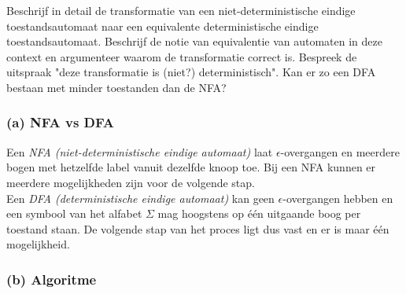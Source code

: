 \begin{question}
Beschrijf in detail de transformatie van een niet-deterministische eindige toestandsautomaat naar een equivalente deterministische eindige toestandsautomaat. Beschrijf de notie van equivalentie van automaten in deze context en argumenteer waarom de transformatie correct is. Bespreek de uitspraak "deze transformatie is (niet?) deterministisch". Kan er zo een DFA bestaan met minder toestanden dan de NFA?
\end{question}

\subsubsection*{(a) NFA vs DFA}

Een \emph{NFA (niet-deterministische eindige automaat)} laat $\epsilon$-overgangen en meerdere bogen met hetzelfde label vanuit dezelfde knoop toe. Bij een NFA kunnen er meerdere mogelijkheden zijn voor de volgende stap.  \\
Een \emph{DFA (deterministische eindige automaat)} kan geen $\epsilon$-overgangen hebben en een symbool van het alfabet $\Sigma$ mag hoogstens op \'e\'en  uitgaande boog per toestand staan. De volgende stap van het proces ligt dus vast en er is maar \'e\'en mogelijkheid.

\subsubsection*{(b) Algoritme}

